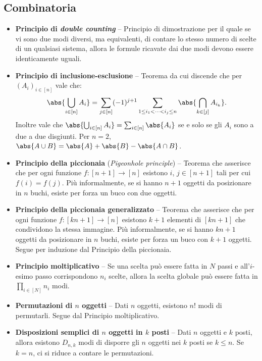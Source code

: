 \begin{multicols*}{2}
\section*{Combinatoria}

\begin{itemize}
    \item \textbf{Principio di \textit{double counting}} -- Principio di dimostrazione per il quale
    se vi sono due modi diversi, ma equivalenti, di contare lo stesso numero di scelte
    di un qualsiasi sistema, allora le formule ricavate dai due modi devono
    essere identicamente uguali.
    \item \textbf{Principio di inclusione-esclusione} -- Teorema da cui discende che per $(A_i)_{i \in [n]}$ vale che: \[\abs{\bigcup_{i \in [n]} A_i} = \sum_{j \in [n]} (-1)^{j+1} \sum_{1 \leq i_1 < \cdots < i_j \leq n} \abs{\bigcap_{k \in [j]} A_{i_k}}.\]
    Inoltre vale che $\abs{\bigcup_{i \in [n]} A_i} = \sum_{i \in [n]} \abs{A_i}$ se e solo se gli $A_i$ sono a due a due disgiunti. Per $n = 2$,
    $\abs{A \cup B} = \abs{A} + \abs{B} - \abs{A \cap B}$.
    \item \textbf{Principio della piccionaia} (\textit{Pigeonhole principle}) -- Teorema che
    asserisce che per ogni funzione $f : [n+1] \to [n]$ esistono $i$, $j \in [n+1]$
    tali per cui $f(i) = f(j)$. Più informalmente, se si hanno $n+1$ oggetti da
    posizionare in $n$ buchi, esiste per forza un buco con due oggetti.
    \item \textbf{Principio della piccionaia generalizzato} -- Teorema che asserisce che
    per ogni funzione $f : [kn+1] \to [n]$ esistono $k+1$ elementi di $[kn+1]$ che
    condividono la stessa immagine. Più informalmente, se si hanno $kn+1$ oggetti
    da posizionare in $n$ buchi, esiste per forza un buco con $k+1$ oggetti. Segue per
    induzione dal Principio della piccionaia.
    \item \textbf{Principio moltiplicativo} -- Se una scelta può essere fatta in $N$
    passi e all'$i$-esimo passo corrispondono $n_i$ scelte, allora la scelta globale
    può essere fatta in $\prod_{i \in [N]} n_i$ modi.
    \item \textbf{Permutazioni di $n$ oggetti} -- Dati $n$ oggetti, esistono
    $n!$ modi di permutarli. Segue dal Principio moltiplicativo.
    \item \textbf{Disposizioni semplici di $n$ oggetti in $k$ posti} -- Dati $n$ oggetti
    e $k$ posti, allora esistono $D_{n,k}$ modi di disporre gli $n$ oggetti nei
    $k$ posti se $k \leq n$. Se $k = n$, ci si riduce a contare le permutazioni.

\end{itemize}
\end{multicols*}
